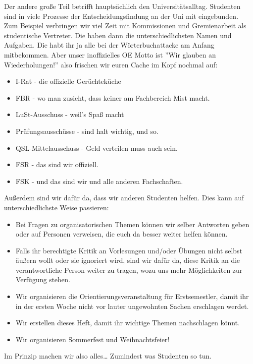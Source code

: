     Der andere große Teil betrifft hauptsächlich den Universitätsalltag.
    Studenten sind in viele Prozesse der Entscheidungsfindung an der Uni
    mit eingebunden.
    Zum Beispiel verbringen wir viel Zeit mit Kommissionen und Gremienarbeit als studentische Vertreter.
    Die haben dann die unterschiedlichsten Namen und Aufgaben.
    Die habt ihr ja alle bei der W\"orterbuchattacke am Anfang mitbekommen.
    Aber unser inoffizielles OE Motto ist ''Wir glauben an Wiederholungen!'' also frischen wir euren Cache im Kopf nochmal auf:
    \begin{itemize}
        \item I-Rat - die offizielle Ger\"uchtek\"uche
        \item FBR - wo man zusieht, dass keiner am Fachbereich Mist macht.
        \item LuSt-Ausschuss - weil's Spa{\ss} macht
        \item Prüfungsausschüsse - sind halt wichtig, und so.
        \item QSL-Mittelausschuss - Geld verteilen muss auch sein.
        \item FSR - das sind wir offiziell.
        \item FSK - und das sind wir und alle anderen Fachschaften.
    \end{itemize}
    Au{\ss}erdem sind wir daf\"ur da, dass wir anderen Studenten helfen. Dies kann auf unterschiedlichste Weise passieren:
    \begin{itemize}
        \item Bei Fragen zu organisatorischen Themen können wir selber Antworten geben oder auf Personen verweisen, die euch da besser weiter helfen können.
        \item Falls ihr berechtigte Kritik an Vorlesungen und/oder Übungen nicht selbst äußern wollt oder sie ignoriert wird, sind wir dafür da, diese Kritik an die verantwortliche Person weiter zu tragen, wozu uns mehr Möglichkeiten zur Verfügung stehen.
        \item Wir organisieren die Orientierungsveranstaltung für Erstsemestler, damit ihr in der ersten Woche nicht vor lauter ungewohnten Sachen erschlagen werdet.
        \item Wir erstellen dieses Heft, damit ihr wichtige Themen nachschlagen könnt.
        \item Wir organisieren Sommerfest und Weihnachtsfeier!
    \end{itemize}
    Im Prinzip machen wir also alles\dots\hspace{1cm} Zumindest was Studenten so tun.
    


